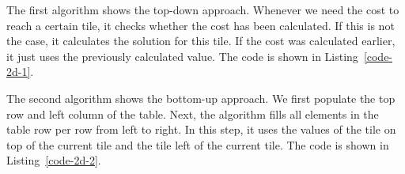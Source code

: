 The first algorithm shows the top-down approach. 
Whenever we need the cost to reach a certain tile, it checks whether the cost has been calculated.
If this is not the case, it calculates the solution for this tile.
If the cost was calculated earlier, it just uses the previously calculated value.
The code is shown in Listing~\ref{code-2d-1}.


The second algorithm shows the bottom-up approach.
We first populate the top row and left column of the table. 
Next, the algorithm fills all elements in the table row per row from left to right.
In this step, it uses the values of the tile on top of the current tile and the tile left of the current tile.
The code is shown in Listing~\ref{code-2d-2}.
